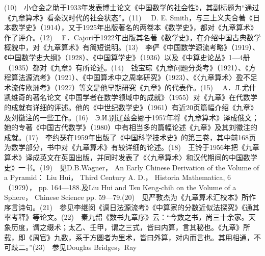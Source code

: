 \documentclass[a4paper,12pt,UTF8,twoside]{ctexbook}
\begin{document}
(10)　小仓金之助于1933年发表博士论文《中国数学的社会性》，其副标题为“通过《九章算术》看秦汉时代的社会状态”。(11)　 D. E. Smith，与三上义夫合著《日本数学史》（1914），又于1925年出版著名的两卷本《数学史》，都对《九章算术》作了评介。(12)　 F．Cajori于1922年出版其名著《数学史》，在介绍中国古典数学概貌中，对《九章算术》有简短说明。(13)　李俨《中国数学源流考略》（1919）、《中国数学史大纲》（1928）、《中国算学史》（1936）以及《中算史论丛》1—4册（1935）都对《九章》有所论述。(14)　钱宝琮《九章问题分类考》（1921）、《方程算法源流考》（1921）、《中国算术中之周率研究》（1923）、《〈九章算术〉盈不足术流传欧洲考》（1927）等文是他早期研究《九章》的代表作。(15)　 A．Л.尤什凯维奇的著名论文《中国学者在数学领域中的成就》（1955）对《九章》在代数学的成就有详细的评述。他的《中世纪数学史》（1961）有近20页篇幅介绍《九章》及刘徽注的一些工作。(16)　Э.И.别辽兹金娜于1957年将《九章算术》译成俄文；她的专著《中国古代数学》（1980）中有相当多的篇幅论述《九章》及其刘徽注的成就。(17)　李约瑟在1959年出版了《中国科学技术史》的第三卷，其中前168页为数学部分，书中对《九章算术》有较详细的论述。(18)　王铃于1956年把《九章算术》译成英文在英国出版，并同时发表了《〈九章算术〉和汉代期间的中国数学史》一书。(19)　见D.B.Wagner， An Early Chinese Derivation of the Volume of a Pyramid： Liu Hui， Third Century A. D.， Historia Mathematica, 6（1979）， pp. 164—188.及Liu Hui and Tsu Keng-chih on the Volume of a Sphere， Chinese Science pp. 59—79.(20)　见严敦杰为《九章算术汇校本》所作序言诗句。(21)　参见李继闵《调日法源流考》《中算家的分数近似法探究》《通其率考释》等论文。(22)　秦九韶《数书九章序》云：“今数之书，尚三十余家。天象历度，谓之缀术；太乙、壬甲，谓之三式，皆曰内算，言其秘也。《九章》所载，即《周官》九数，系于方圆者为里术，皆曰外算，对内而言也。其用相通，不可歧二。”(23)　参见Douglas Bridges，Ray 
\end{document}
